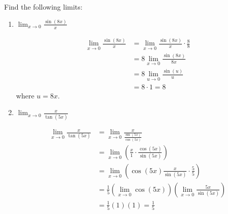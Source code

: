 \documentclass[nooutcomes]{ximera}
\begin{document}
\begin{problem}
Find the following limits:

	\begin{enumerate}
	
	\item  $\lim_{x \to 0} \frac{\sin(8x)}{x}$
			\begin{freeResponse}
			\begin{align*}
			\lim_{x \to 0} \frac{\sin(8x)}{x} &= \lim_{x \to 0} \frac{\sin(8x)}{x} \cdot \frac{8}{8}  \\
			&= 8 \lim_{x \to 0} \frac{\sin(8x)}{8x}  \\
			&= 8 \lim_{u \to 0} \frac{\sin(u)}{u}  \\
			&= 8 \cdot 1 = 8
			\end{align*}
			where $u = 8x$.  
			\end{freeResponse}
			
	
	\item  $\lim_{x \to 0} \frac{x}{\tan(5x)}$
			\begin{freeResponse}
			\begin{align*}
			\lim_{x \to 0} \frac{x}{\tan(5x)} &= \lim_{x \to 0} \frac{x}{\frac{\sin(5x)}{\cos(5x)}}  \\
			&= \lim_{x \to 0} \left( \frac{x}{1} \cdot \frac{\cos(5x)}{\sin(5x)} \right)  \\
			&= \lim_{x \to 0} \left( \cos(5x) \frac{x}{\sin(5x)} \cdot \frac{5}{5} \right)  \\
			&= \frac{1}{5} \left( \lim_{x \to 0} \cos(5x) \right) \left( \lim_{x \to 0} \frac{5x}{\sin(5x)} \right)  \\
			&= \frac{1}{5} (1) (1) = \frac{1}{5}
			\end{align*}
			\end{freeResponse}
			
			
			
	\end{enumerate}
\end{problem}
	
\end{document}
